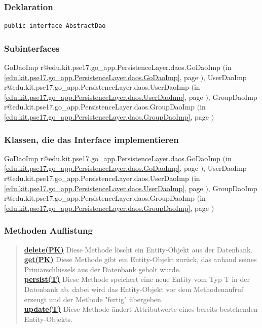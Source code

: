 \documentclass[11pt,a4paper]{article}
\makeatletter
\newcommand{\refdefined}[1]{
\expandafter\ifx\csname r@#1\endcsname\relax
\relax\else
{$($in \ref{#1}, page \pageref{#1}$)$}\fi}
\makeatother
\begin{document}
{{{{{{{\subsubsection{Deklaration}{
\begin{lstlisting}[frame=none]
public interface AbstractDao
\end{lstlisting}
\subsubsection{Subinterfaces}{GoDaoImp\small{\refdefined{edu.kit.pse17.go_app.PersistenceLayer.daos.GoDaoImp}}, UserDaoImp\small{\refdefined{edu.kit.pse17.go_app.PersistenceLayer.daos.UserDaoImp}}, GroupDaoImp\small{\refdefined{edu.kit.pse17.go_app.PersistenceLayer.daos.GroupDaoImp}}}
\subsubsection{Klassen, die das Interface implementieren}{GoDaoImp\small{\refdefined{edu.kit.pse17.go_app.PersistenceLayer.daos.GoDaoImp}}, UserDaoImp\small{\refdefined{edu.kit.pse17.go_app.PersistenceLayer.daos.UserDaoImp}}, GroupDaoImp\small{\refdefined{edu.kit.pse17.go_app.PersistenceLayer.daos.GroupDaoImp}}}
\subsubsection{Methoden Auflistung}{
\begin{verse}
\hyperlink{edu.kit.pse17.go_app.PersistenceLayer.daos.AbstractDao.delete(PK)}{{\bf delete(PK)}} Diese Methode löscht ein Entity-Objekt aus der Datenbank.\\
\hyperlink{edu.kit.pse17.go_app.PersistenceLayer.daos.AbstractDao.get(PK)}{{\bf get(PK)}} Diese Methode gibt ein Entity-Objekt zurück, das anhand seines Primärschlüssels aus der Datenbank geholt wurde.\\
\hyperlink{edu.kit.pse17.go_app.PersistenceLayer.daos.AbstractDao.persist(T)}{{\bf persist(T)}} Diese Methode speichert eine neue Entity vom Typ T in der Datenbank ab. dabei wird das Entity-Objekt vor dem Methodenaufruf erzeugt und der Methode "fertig" übergeben.\\
\hyperlink{edu.kit.pse17.go_app.PersistenceLayer.daos.AbstractDao.update(T)}{{\bf update(T)}} Diese Methode ändert Attributwerte eines bereits bestehenden Entity-Objekts.\\
\end{verse}
}
}}}}}}}}
\end{document}
